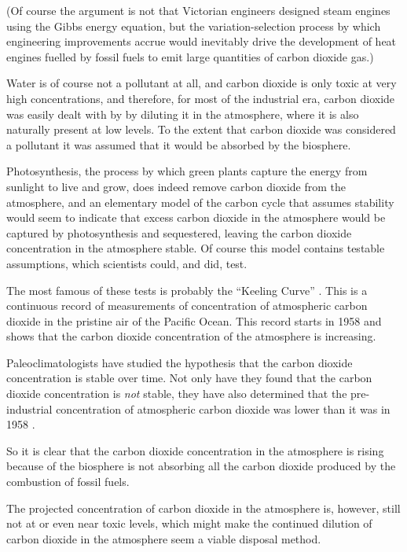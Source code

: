 (Of course the argument is not that Victorian engineers designed steam engines
using the Gibbs energy equation, but the variation-selection process
\autocite[Chapter 8]{Vincenti1990} by which engineering improvements accrue would
inevitably drive the development of heat engines fuelled by fossil fuels to emit
large quantities of carbon dioxide gas.)

Water is of course not a pollutant at all, and carbon dioxide is only toxic at
very high concentrations, and therefore, for most of the industrial era, carbon
dioxide was easily dealt with by by diluting it in the atmosphere, where it is
also naturally present at low levels. To the extent that carbon dioxide was
considered a pollutant it was assumed that it would be absorbed by the
biosphere.

Photosynthesis, the process by which green plants capture the energy from
sunlight to live and grow, does indeed remove carbon dioxide from the
atmosphere, and an elementary model of the carbon cycle that assumes stability
would seem to indicate that excess carbon dioxide in the atmosphere would be
captured by photosynthesis and sequestered, leaving the carbon dioxide
concentration in the atmosphere stable. Of course this model contains
testable assumptions, which scientists could, and did, test.

The most famous of these tests is probably the ``Keeling Curve''
\autocite{Harris2010}. This is a continuous record of measurements of
concentration of atmospheric carbon dioxide in the pristine air of the Pacific
Ocean. This record starts in 1958 and shows that the carbon dioxide
concentration of the atmosphere is increasing.

Paleoclimatologists have studied the hypothesis that the carbon dioxide
concentration is stable over time. Not only have they found that the carbon
dioxide concentration is \emph{not} stable, they have also determined that the
pre-industrial concentration of atmospheric carbon dioxide was lower than it was
in 1958 \autocite{Petit1999}.

So it is clear that the carbon dioxide concentration in the atmosphere is rising
because of the biosphere is not absorbing all the carbon dioxide produced by the
combustion of fossil fuels. 

The projected concentration of carbon dioxide in the atmosphere is, however,
still not at or even near toxic levels, which might make the continued dilution
of carbon dioxide in the atmosphere seem a viable disposal method.

